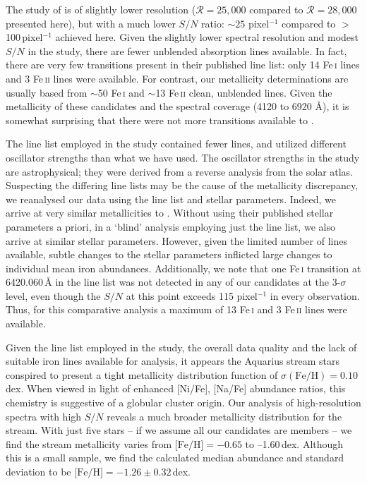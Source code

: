 \documentclass{emulateapj}
\begin{document}
The study of \citet{wylie-de-boer;et-al_2012} is of slightly lower resolution ($\mathcal{R} = 25,000$ compared to $\mathcal{R} = 28,000$ presented here), but with a much lower $S/N$ ratio: $\sim{}25$ pixel$^{-1}$ compared to $>$100\,pixel$^{-1}$ achieved here. Given the slightly lower spectral resolution and modest $S/N$ in the \citet{wylie-de-boer;et-al_2012} study, there are fewer unblended absorption lines available. In fact, there are very few transitions present in their published line list: only 14 Fe\,\textsc{i} lines and 3 Fe\,\textsc{ii} lines were available. For contrast, our metallicity determinations are usually based from ${\sim}$50 Fe\,\textsc{i} and ${\sim}$13 Fe\,\textsc{ii} clean, unblended lines. Given the metallicity of these candidates and the spectral coverage (4120 to 6920 {\AA}), it is somewhat surprising that there were not more transitions available to \citet{wylie-de-boer;et-al_2012}. 


The line list employed in the \citet{wylie-de-boer;et-al_2012} study contained fewer lines, and utilized different oscillator strengths than what we have used. The oscillator strengths in the \citet{wylie-de-boer;et-al_2012} study are astrophysical; they were derived from a reverse analysis from the \citet{hinkle;et-al_2003} solar atlas. Suspecting the differing line lists may be the cause of the metallicity discrepancy, we reanalysed our data using the \citet{wylie-de-boer;et-al_2012} line list and stellar parameters. Indeed, we arrive at very similar metallicities to \citet{wylie-de-boer;et-al_2012}. Without using their published stellar parameters a priori, in a `blind' analysis employing just the \citet{wylie-de-boer;et-al_2012} line list, we also arrive at similar stellar parameters. However, given the limited number of lines available, subtle changes to the stellar parameters inflicted large changes to individual mean iron abundances.  Additionally, we note that one Fe\,\textsc{i} transition at 6420.060\,\AA{} in the \citet{wylie-de-boer;et-al_2012} line list was not detected in any of our candidates at the 3-$\sigma$ level, even though the $S/N$ at this point exceeds 115 pixel$^{-1}$ in every observation. Thus, for this comparative analysis a maximum of 13 Fe\,\textsc{i} and 3 Fe\,\textsc{ii} lines were available.

Given the line list employed in the \citet{wylie-de-boer;et-al_2012} study, the overall data quality and the lack of suitable iron lines available for analysis, it appears the Aquarius stream stars conspired to present a tight metallicity distribution function of $\sigma(\mbox{Fe/H}) = 0.10$\,dex. When viewed in light of enhanced [Ni/Fe], [Na/Fe] abundance ratios, this chemistry is suggestive of a globular cluster origin. Our analysis of high-resolution spectra with high $S/N$ reveals a much broader metallicity distribution for the stream. With just five stars \--- if we assume all our candidates are members \--- we find the stream metallicity varies from $\mbox{[Fe/H]} = -0.65$ to --1.60\,dex. Although this is a small sample, we find the calculated median abundance and standard deviation to be $\mbox{[Fe/H]} = -1.26 \pm 0.32$\,dex.
\end{document}
